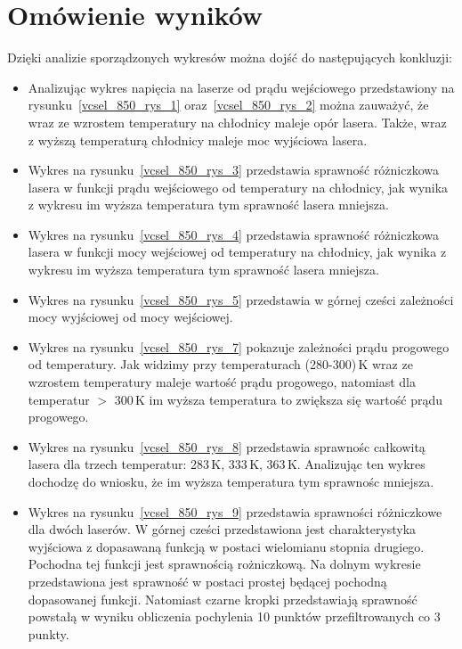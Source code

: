 \section{Omówienie wyników}
Dzięki analizie sporządzonych wykresów można dojść do następujących konkluzji:
\begin{itemize}
\item Analizując wykres napięcia na laserze od prądu wejściowego przedstawiony na rysunku~\ref{vcsel_850_rys_1} oraz~\ref{vcsel_850_rys_2} można zauważyć, że wraz ze wzrostem temperatury na chłodnicy
maleje opór lasera. Także, wraz z wyższą temperaturą chłodnicy maleje moc wyjściowa lasera.
\item Wykres na rysunku~\ref{vcsel_850_rys_3} przedstawia sprawność różniczkowa lasera w funkcji prądu wejściowego od temperatury na chłodnicy, jak wynika z wykresu im
wyższa temperatura tym sprawność lasera mniejsza.
\item Wykres na rysunku~\ref{vcsel_850_rys_4} przedstawia sprawność różniczkowa lasera w funkcji mocy wejściowej od temperatury na chłodnicy, jak wynika z wykresu im
wyższa temperatura tym sprawność lasera mniejsza.
\item Wykres na rysunku~\ref{vcsel_850_rys_5} przedstawia w górnej cześci zależności mocy wyjściowej od mocy wejściowej.
\item Wykres na rysunku~\ref{vcsel_850_rys_7} pokazuje zależności prądu progowego od temperatury. Jak widzimy przy temperaturach (280-300)\,K
wraz ze wzrostem temperatury maleje wartość prądu progowego, natomiast dla temperatur $>$ 300\,K im wyższa temperatura to zwiększa się
wartość prądu progowego.
\item Wykres na rysunku~\ref{vcsel_850_rys_8} przedstawia sprawnośc całkowitą lasera dla trzech temperatur: 283\,K, 333\,K, 363\,K. Analizując ten wykres
dochodzę do wniosku, że im wyższa temperatura tym sprawnośc mniejsza.
\item Wykres na rysunku~\ref{vcsel_850_rys_9} przedstawia sprawności różniczkowe dla dwóch laserów. W górnej cześci przedstawiona jest charakterystyka
wyjściowa z dopasawaną funkcją w postaci wielomianu stopnia drugiego. Pochodna tej funkcji jest sprawnością rożniczkową. Na dolnym wykresie przedstawiona
jest sprawność w postaci prostej będącej pochodną dopasowanej funkcji. Natomiast czarne kropki przedstawiają sprawność powstałą w wyniku obliczenia pochylenia
10 punktów przefiltrowanych co 3 punkty.
\end{itemize}
